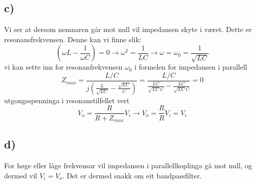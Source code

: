 \documentclass[12pt,a4paper]{article}
\begin{document}
    \subsection*{c)}
    Vi ser at dersom nemnaren går mot null vil impedansen skyte i været. Dette er
    resonansfrekvensen. Denne kan vi finne slik:
    \begin{equation}
      \left(\omega L - \frac{1}{\omega C}\right) = 0 \rightarrow \omega ^2 = \frac{1}{LC}
      \rightarrow \omega = \omega_0 = \frac{1}{\sqrt{LC}}
    \end{equation}
    vi kan sette inn for resonanfrekvensen $\omega_0$ i formelen for impedansen i parallell
    \begin{equation}
      Z_{max} = \frac{L/C}{j(\frac{L}{\sqrt{LC}} - \frac{\sqrt{LC}}{C})} =
      \frac{L/C}{\frac{LC}{\sqrt{LC}C} - \frac{LC}{\sqrt{LC}C}} = 0
    \end{equation}
    utgongsspenninga i resonanstilfellet vert
    \begin{equation}
      V_o = \frac{R}{R + Z_{max}}V_i \longrightarrow
      V_o = \frac{R}{R}V_i = V_i
    \end{equation}

    \subsection*{d)}
    For høge eller låge frekvensar vil impedansen i parallellkoplinga gå mot null, og dermed
    vil $V_i = V_o$. Det er dermed snakk om eit bandpassfilter.


    \begin{center}
    \end{center}
\end{document}
